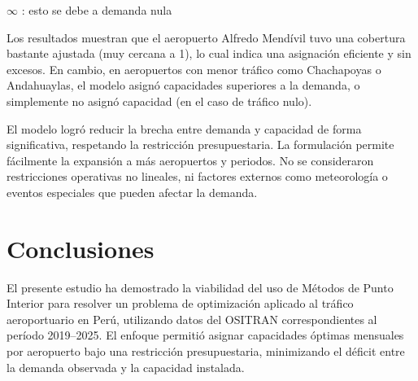 \documentclass[11pt, a4paper, twocolumn]{article}
\begin{document}
\begin{table}[H]
\centering
{}
\caption{Cobertura promedio y extrema de capacidad por aeropuerto.}
\label{tab:cobertura_promedio}
\end{table}

$\infty$ : esto se debe a demanda nula

Los resultados muestran que el aeropuerto Alfredo Mendívil tuvo una cobertura bastante ajustada (muy cercana a 1), lo cual indica una asignación eficiente y sin excesos. En cambio, en aeropuertos con menor tráfico como Chachapoyas o Andahuaylas, el modelo asignó capacidades superiores a la demanda, o simplemente no asignó capacidad (en el caso de tráfico nulo).



El modelo logró reducir la brecha entre demanda y capacidad de forma significativa, respetando la restricción presupuestaria.
La formulación permite fácilmente la expansión a más aeropuertos y periodos.
No se consideraron restricciones operativas no lineales, ni factores externos como meteorología o eventos especiales que pueden afectar la demanda.



\section{Conclusiones}

El presente estudio ha demostrado la viabilidad del uso de Métodos de Punto Interior para resolver un problema de optimización aplicado al tráfico aeroportuario en Perú, utilizando datos del OSITRAN correspondientes al período 2019–2025. El enfoque permitió asignar capacidades óptimas mensuales por aeropuerto bajo una restricción presupuestaria, minimizando el déficit entre la demanda observada y la capacidad instalada.
\end{document}
